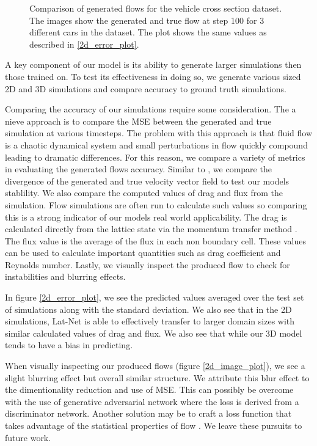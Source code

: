 \documentclass{article}
\begin{document}
\begin{figure}[!t]
\caption{Comparison of generated flows for the vehicle cross section dataset. The images show the generated and true flow at step 100 for 3 different cars in the dataset. The plot shows the same values as described in \ref{2d_error_plot}.}
\label{car_dataset}
\end{figure}


A key component of our model is its ability to generate larger simulations then those trained on. To test its effectiveness in doing so, we generate various sized 2D and 3D simulations and compare accuracy to ground truth simulations.

Comparing the accuracy of our simulations require some consideration. The a nieve approach is to compare the MSE between the generated and true simulation at various timesteps. The problem with this approach is that fluid flow is a chaotic dynamical system and small perturbations in flow quickly compound leading to dramatic differences. For this reason, we compare a variety of metrics in evaluating the generated flows accuracy. Similar to \cite{tompson2016accelerating}, we compare the divergence of the generated and true velocity vector field to test our models stablility. We also compare the computed values of drag and flux from the simulation. Flow simulations are often run to calculate such values so comparing this is a strong indicator of our models real world applicability. The drag is calculated directly from the lattice state via the momentum transfer method \cite{guo2013lattice}. The flux value is the average of the flux in each non boundary cell. These values can be used to calculate important quantities such as drag coefficient and Reynolds number. Lastly, we visually inspect the produced flow to check for instabilities and blurring effects.

In figure \ref{2d_error_plot}, we see the predicted values averaged over the test set of simulations along with the standard deviation. We also see that in the 2D simulations, Lat-Net is able to effectively transfer to larger domain sizes with similar calculated values of drag and flux. We also see that while our 3D model tends to have a bias in predicting.

When visually inspecting our produced flows (figure \ref{2d_image_plot}), we see a slight blurring effect but overall similar structure. We attribute this blur effect to the dimentionality reduction and use of MSE. This can possibly be overcome with the use of generative adversarial network \cite{goodfellow2014generative} where the loss is derived from a discriminator network. Another solution may be to craft a loss function that takes advantage of the statistical properties of flow \cite{kim2008wavelet}. We leave these pursuits to future work.
\end{document}
